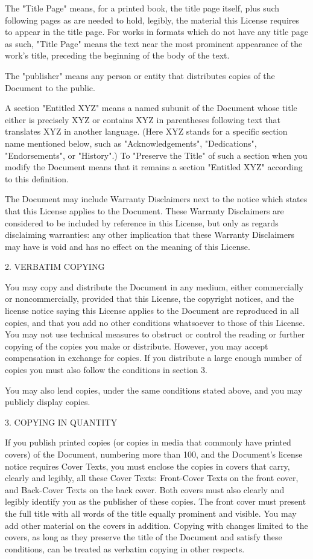 \documentclass[11pt,a4paper]{article}
\begin{document}
\begin{scriptsize}
The "Title Page" means, for a printed book, the title page itself,
plus such following pages as are needed to hold, legibly, the material
this License requires to appear in the title page.  For works in
formats which do not have any title page as such, "Title Page" means
the text near the most prominent appearance of the work's title,
preceding the beginning of the body of the text.

The "publisher" means any person or entity that distributes copies of
the Document to the public.

A section "Entitled XYZ" means a named subunit of the Document whose
title either is precisely XYZ or contains XYZ in parentheses following
text that translates XYZ in another language.  (Here XYZ stands for a
specific section name mentioned below, such as "Acknowledgements",
"Dedications", "Endorsements", or "History".)  To "Preserve the Title"
of such a section when you modify the Document means that it remains a
section "Entitled XYZ" according to this definition.

The Document may include Warranty Disclaimers next to the notice which
states that this License applies to the Document.  These Warranty
Disclaimers are considered to be included by reference in this
License, but only as regards disclaiming warranties: any other
implication that these Warranty Disclaimers may have is void and has
no effect on the meaning of this License.

2. VERBATIM COPYING

You may copy and distribute the Document in any medium, either
commercially or noncommercially, provided that this License, the
copyright notices, and the license notice saying this License applies
to the Document are reproduced in all copies, and that you add no
other conditions whatsoever to those of this License.  You may not use
technical measures to obstruct or control the reading or further
copying of the copies you make or distribute.  However, you may accept
compensation in exchange for copies.  If you distribute a large enough
number of copies you must also follow the conditions in section 3.

You may also lend copies, under the same conditions stated above, and
you may publicly display copies.


3. COPYING IN QUANTITY

If you publish printed copies (or copies in media that commonly have
printed covers) of the Document, numbering more than 100, and the
Document's license notice requires Cover Texts, you must enclose the
copies in covers that carry, clearly and legibly, all these Cover
Texts: Front-Cover Texts on the front cover, and Back-Cover Texts on
the back cover.  Both covers must also clearly and legibly identify
you as the publisher of these copies.  The front cover must present
the full title with all words of the title equally prominent and
visible.  You may add other material on the covers in addition.
Copying with changes limited to the covers, as long as they preserve
the title of the Document and satisfy these conditions, can be treated
as verbatim copying in other respects.


\end{scriptsize}
\end{document}
